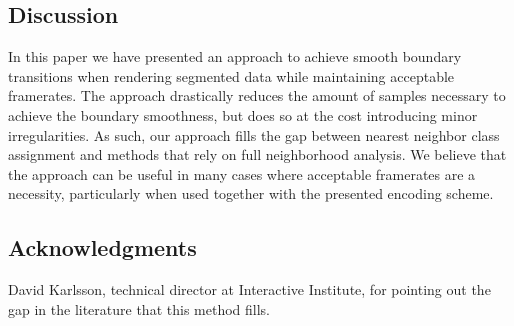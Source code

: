 \documentclass{egpubl}
\begin{document}
\subsection{Discussion}

In this paper we have presented an approach to achieve smooth boundary transitions when rendering segmented data while maintaining acceptable framerates. The approach drastically reduces the amount of samples necessary to achieve the boundary smoothness, but does so at the cost introducing minor irregularities. As such, our approach fills the gap between nearest neighbor class assignment and methods that rely on full neighborhood analysis. We believe that the approach can be useful in many cases where acceptable framerates are a necessity, particularly when used together with the presented encoding scheme.


\subsection{Acknowledgments}

David Karlsson, technical director at Interactive Institute, for pointing out the gap in the literature that this method fills.

%





\end{document}
